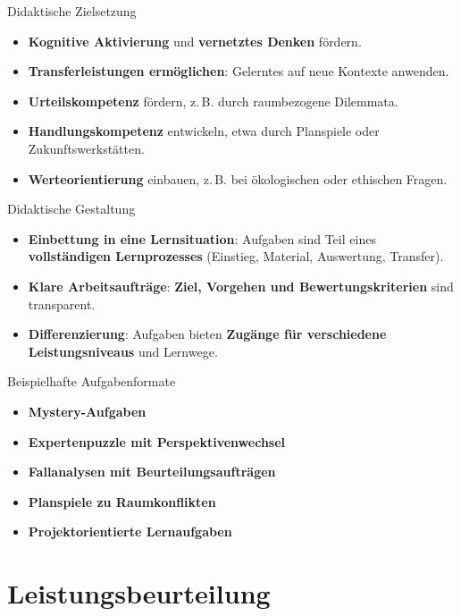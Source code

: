 Didaktische Zielsetzung
\begin{itemize}
  \item \textbf{Kognitive Aktivierung} und \textbf{vernetztes Denken} fördern.
  \item \textbf{Transferleistungen ermöglichen}: Gelerntes auf neue Kontexte anwenden.
  \item \textbf{Urteilskompetenz} fördern, z.\,B. durch raumbezogene Dilemmata.
  \item \textbf{Handlungskompetenz} entwickeln, etwa durch Planspiele oder Zukunftswerkstätten.
  \item \textbf{Werteorientierung} einbauen, z.\,B. bei ökologischen oder ethischen Fragen.
\end{itemize}

Didaktische Gestaltung
\begin{itemize}
  \item \textbf{Einbettung in eine Lernsituation}: Aufgaben sind Teil eines \textbf{vollständigen Lernprozesses} (Einstieg, Material, Auswertung, Transfer).
  \item \textbf{Klare Arbeitsaufträge}: \textbf{Ziel, Vorgehen und Bewertungskriterien} sind transparent.
  \item \textbf{Differenzierung}: Aufgaben bieten \textbf{Zugänge für verschiedene Leistungsniveaus} und Lernwege.
\end{itemize}

Beispielhafte Aufgabenformate
\begin{itemize}
  \item \textbf{Mystery-Aufgaben}
  \item \textbf{Expertenpuzzle mit Perspektivenwechsel}
  \item \textbf{Fallanalysen mit Beurteilungsaufträgen}
  \item \textbf{Planspiele zu Raumkonflikten}
  \item \textbf{Projektorientierte Lernaufgaben}
\end{itemize}

\section{Leistungsbeurteilung}

